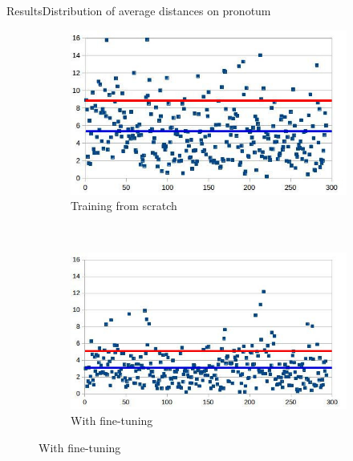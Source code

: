 \documentclass[10pt,svgnames]{beamer}
\begin{document}
\begin{frame}{Results}{Distribution of average distances on pronotum}
\begin{itemize}
{\begin{figure}[htbp]
   				\begin{subfigure}[t]{0.5\textwidth}
        			\centering
        			\includegraphics[scale=.4]{images/lm6_cnn_2}
        			\caption{Training from scratch}
    			\end{subfigure}%
    			~ 
    			\begin{subfigure}[t]{0.5\textwidth}
        			\centering
        			\includegraphics[scale=.38]{images/lm6_finetuning_2}
        			\caption{With fine-tuning}
    			\end{subfigure}    		
			\end{figure}
		}
	\end{itemize}

\end{frame}
\end{document}
